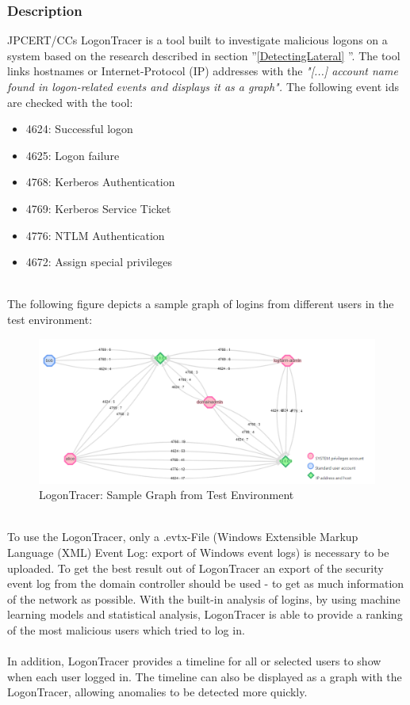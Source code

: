 \subsubsection{Description}
JPCERT/CCs LogonTracer is a tool built to investigate malicious logons on a system based on the research described in section ''\ref{DetectingLateral} ''. The tool links hostnames or Internet-Protocol (IP) addresses with the \textit{"[...] account name found in logon-related events and displays it as a graph". \cite{LogonTracer}}  The following event ids are checked with the tool: 
\ \\
\begin{multicols}{2}
    \begin{itemize}
        \item 4624: Successful logon
        \item 4625: Logon failure
        \item 4768: Kerberos Authentication
        \item 4769: Kerberos Service Ticket
        \item 4776: NTLM Authentication
        \item 4672: Assign special privileges
    \end{itemize}
\end{multicols} \ \\
The following figure depicts a sample graph of logins from different users in the test environment:
\begin{figure}[H]
    \centering
    \includegraphics[width=0.8\linewidth]{assets/LogonTracer/LogonTrace_LogFarm.png}
    \caption{LogonTracer: Sample Graph from Test Environment}
    \label{fig:LogonTracerSample}
\end{figure}
\ \\
To use the LogonTracer, only a .evtx-File (Windows Extensible Markup Language (XML) Event Log: export of Windows event logs) is necessary to be uploaded. To get the best result out of LogonTracer an export of the security event log from the domain controller should be used - to get as much information of the network as possible. With the built-in analysis of logins, by using machine learning models and statistical analysis, LogonTracer is able to provide a ranking of the most malicious users which tried to log in. \cite{LogonTracerBlog}
\\\\
In addition, LogonTracer provides a timeline for all or selected users to show when each user logged in. The timeline can also be displayed as a graph with the LogonTracer, allowing anomalies to be detected more quickly.


